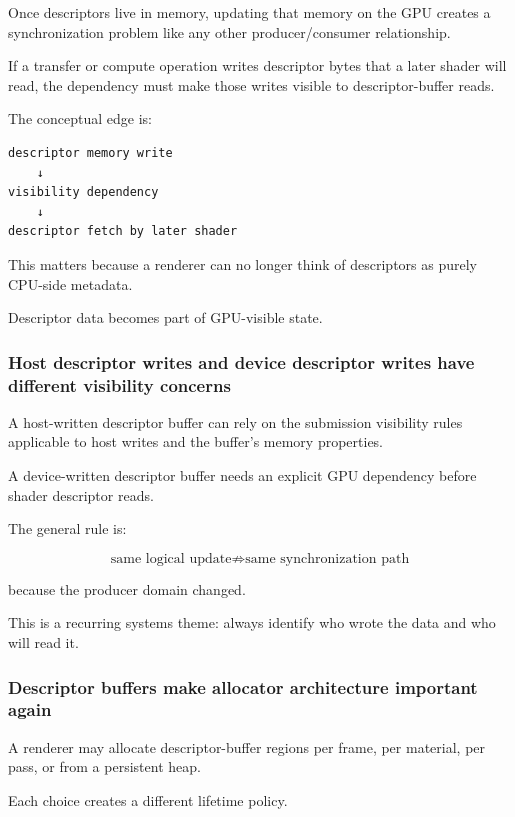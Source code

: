 Once descriptors live in memory, updating that memory on the GPU creates a synchronization problem like any other producer/consumer relationship.

If a transfer or compute operation writes descriptor bytes that a later shader will read, the dependency must make those writes visible to descriptor-buffer reads.

The conceptual edge is:

\begin{verbatim}
descriptor memory write
    ↓
visibility dependency
    ↓
descriptor fetch by later shader
\end{verbatim}

This matters because a renderer can no longer think of descriptors as purely CPU-side metadata.

Descriptor data becomes part of GPU-visible state.

\subsubsection{Host descriptor writes and device descriptor writes have different visibility concerns}\label{05-engine-i-ch023-host-descriptor-writes-and-device-descriptor-writes-have-different-visibility-concerns}

A host-written descriptor buffer can rely on the submission visibility rules applicable to host writes and the buffer's memory properties.

A device-written descriptor buffer needs an explicit GPU dependency before shader descriptor reads.

The general rule is:

\[
\boxed{
\text{same logical update}
\not\Rightarrow
\text{same synchronization path}
}
\]

because the producer domain changed.

This is a recurring systems theme: always identify who wrote the data and who will read it.

\subsubsection{Descriptor buffers make allocator architecture important again}\label{05-engine-i-ch023-descriptor-buffers-make-allocator-architecture-important-again}

A renderer may allocate descriptor-buffer regions per frame, per material, per pass, or from a persistent heap.

Each choice creates a different lifetime policy.

